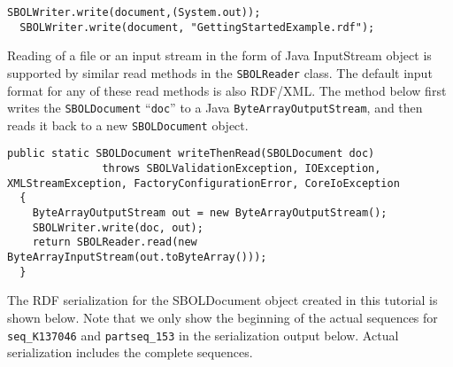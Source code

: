 \begin{minipage}{0.95\textwidth} 
\begin{lstlisting}[basicstyle=\footnotesize\ttfamily]
  SBOLWriter.write(document,(System.out));
  SBOLWriter.write(document, "GettingStartedExample.rdf");
\end{lstlisting}
\end{minipage}

Reading of a file or an input stream in the form of Java InputStream
object is supported by similar read methods in the \lstinline+SBOLReader+
class. The default input format for any of these read methods is also
RDF/XML. The method below first writes the \lstinline+SBOLDocument+
``\lstinline+doc+'' to a Java \lstinline+ByteArrayOutputStream+,
and then reads it back to a new \lstinline+SBOLDocument+ object.

\begin{minipage}{0.95\textwidth} 
\begin{lstlisting}[basicstyle=\footnotesize\ttfamily]
  public static SBOLDocument writeThenRead(SBOLDocument doc)
               throws SBOLValidationException, IOException, XMLStreamException, FactoryConfigurationError, CoreIoException
  {
    ByteArrayOutputStream out = new ByteArrayOutputStream();
    SBOLWriter.write(doc, out);
    return SBOLReader.read(new ByteArrayInputStream(out.toByteArray()));
  }
\end{lstlisting}
\end{minipage}

The RDF serialization for the SBOLDocument object created in this
tutorial is shown below. Note that we only show the beginning of the
actual sequences for \lstinline+seq_K137046+ and
\lstinline+partseq_153+ in the serialization output below. Actual
serialization includes the complete sequences.

